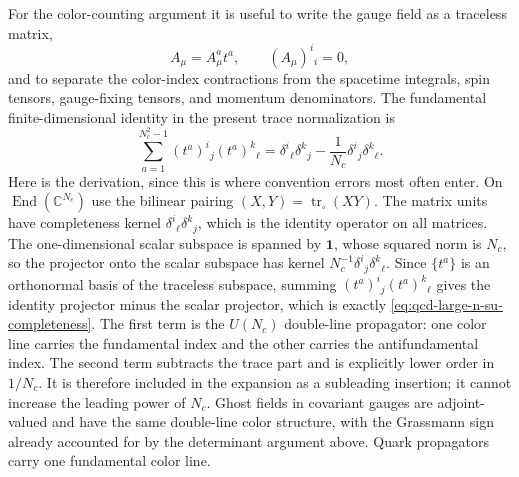 For the color-counting argument it is useful to write the gauge field as a
traceless matrix,
\[
  A_\mu=A_\mu^a t^a,\qquad (A_\mu)^i{}_i=0,
\]
and to separate the color-index contractions from the spacetime integrals,
spin tensors, gauge-fixing tensors, and momentum denominators.  The
fundamental finite-dimensional identity in the present trace normalization is
\begin{equation}
  \sum_{a=1}^{N_c^2-1}
  (t^a)^i{}_{j}(t^a)^k{}_{\ell}
  =
  \delta^i{}_{\ell}\delta^k{}_{j}
  -\frac1{N_c}\delta^i{}_{j}\delta^k{}_{\ell}.
  \label{eq:qcd-large-n-su-completeness}
\end{equation}
Here is the derivation, since this is where convention errors most often
enter.  On \(\operatorname{End}(\mathbb C^{N_c})\) use the bilinear pairing
\((X,Y)=\operatorname{tr}_{\square}(XY)\).  The matrix units have completeness
kernel \(\delta^i{}_{\ell}\delta^k{}_{j}\), which is the identity operator on
all matrices.  The one-dimensional scalar subspace is spanned by
\(\mathbf 1\), whose squared norm is \(N_c\), so the projector onto the scalar
subspace has kernel \(N_c^{-1}\delta^i{}_{j}\delta^k{}_{\ell}\).  Since
\(\{t^a\}\) is an orthonormal basis of the traceless subspace, summing
\((t^a)^i{}_j(t^a)^k{}_\ell\) gives the identity projector minus the scalar
projector, which is exactly \eqref{eq:qcd-large-n-su-completeness}.
The first term is the \(U(N_c)\) double-line propagator: one color line carries
the fundamental index and the other carries the antifundamental index.  The
second term subtracts the trace part and is explicitly lower order in
\(1/N_c\).  It is therefore included in the expansion as a subleading
insertion; it cannot increase the leading power of \(N_c\).  Ghost fields in
covariant gauges are adjoint-valued and have the same double-line color
structure, with the Grassmann sign already accounted for by the determinant
argument above.  Quark propagators carry one fundamental color line.

